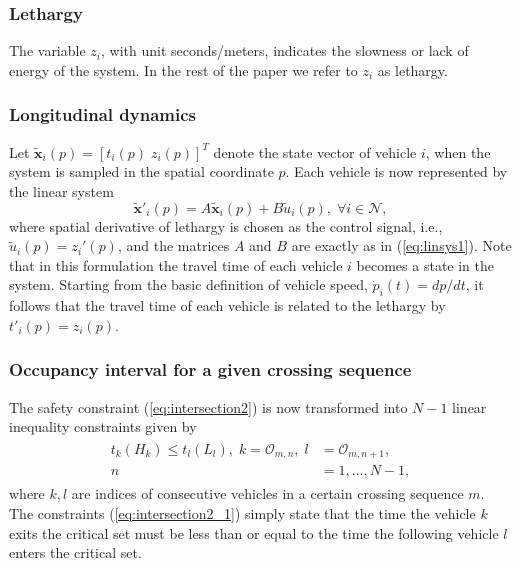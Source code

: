 \documentclass[letterpaper,10pt,conference]{ieeeconf}
\begin{document}
\subsubsection{Lethargy} The variable $z_i$, with unit seconds/meters, indicates the slowness or lack of energy of the system. In the rest of the paper we refer to $z_i$ as lethargy.

\subsubsection{Longitudinal dynamics} Let \mbox{$\mathbf{\tilde x}_i(p)=[t_i(p) \; z_i(p)]^T$} denote the state vector of vehicle $i$, when the system is sampled in the spatial coordinate $p$. Each vehicle is now represented by the linear system
\begin{equation}\label{model}
\mathbf{\tilde x'}_i(p)=A \mathbf{\tilde x}_i(p)+ B \tilde u_i(p), \; \forall i \in \mathcal{N},
\end{equation}
where spatial derivative of lethargy is chosen as the control signal, i.e., \mbox{$\tilde u_i(p)=z_i'(p)$}, and the matrices $A$ and $B$ are exactly as in (\ref{eq:linsys1}). Note that in this formulation the travel time of each vehicle $i$ becomes a state in the system. Starting from the basic definition of vehicle speed, $\dot p_i(t)=dp/dt$, it follows that the travel time of each vehicle is related to the lethargy by $t'_i(p)=z_i(p)$.

\subsubsection{Occupancy interval for a given crossing sequence} The safety constraint (\ref{eq:intersection2})  is now transformed into $N-1$ linear inequality constraints given by
\begin{align} \label{eq:intersection2_1}
\begin{split}
t_k(H_k) \leq t_l(L_l), \; k=\mathcal{O}_{m,n}, \; l&=\mathcal{O}_{m,n+1}, \\
n&=1,...,N-1,
\end{split}
\end{align}
where $k, l$ are indices of consecutive vehicles in a certain crossing sequence $m$. The constraints (\ref{eq:intersection2_1}) simply state that the time the vehicle $k$ exits the critical set must be less than or equal to the time the following vehicle $l$ enters the critical set.
\end{document}
